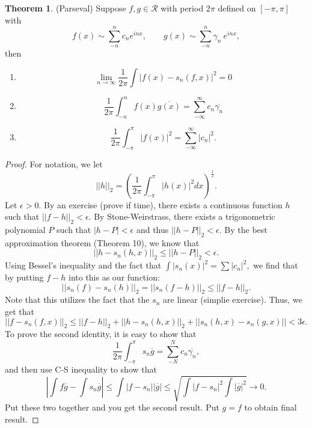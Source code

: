 \documentclass[10pt, oneside]{article}
\theoremstyle{definition}
\newtheorem{thm}{Theorem}
\begin{document}
\begin{thm}
    (Parseval) Suppose $f,g \in \mathcal{R}$ with period $2\pi$ defined on $[-\pi, \pi]$ with 
    \[f(x)\sim \sum_{-n}^n c_n e^{inx}, \qquad g(x) \sim \sum_{-n}^n \gamma_n\ e^{inx},\]
    then 
    \begin{enumerate}
        \item \[\lim_{n\to \infty}\frac{1}{2\pi}\int |f(x) - s_n(f,x)|^2 = 0\]
        \item \[\frac{1}{2\pi}\int_{-n}^n f(x)\overline{g(x)} = \sum_{-\infty}^\infty c_n \overline{\gamma_n}\]
        \item 
        \[\frac{1}{2\pi}\int_{-\pi}^\pi |f(x)|^2 = \sum_{-\infty}^\infty |c_n|^2.\]
    \end{enumerate}
\end{thm}
\begin{proof}
    For notation, we let 
    \[||h||_2 = \left(\frac{1}{2\pi}\int_{-\pi}^\pi |h(x)|^2 dx\right)^{\frac{1}{2}}.\] Let $\epsilon>0.$ By an exercise (prove if time), there exists a continuous function $h$ such that $||f-h||_2 < \epsilon.$ By Stone-Weirstrass, there exists a trigonometric polynomial $P$ such that $|h-P|< \epsilon$ and thus $||h-P||_2 < \epsilon.$ By the best approximation theorem (Theorem 10), we know that 
    \[||h-s_n(h,x)||_2 \leq ||h-P||_2 < \epsilon.\] Using Bessel's inequality and the fact that $\int |s_n(x)|^2 = \sum|c_n|^2,$ we find that by putting $f-h$ into this as our function:
    \[||s_n(f) - s_n(h)||_2 = ||s_n(f-h)||_2 \leq ||f-h||_2.\] Note that this utilizes the fact that the $s_n$ are linear (simplie exercise). Thus, we get that 
    \[||f-s_n(f,x)||_2 \leq ||f-h||_2 + ||h-s_n(h,x)||_2 + ||s_n(h,x) - s_n(g,x)||< 3\epsilon.\] To prove the second identity, it is easy to show that
    \[\frac{1}{2\pi}\int_{-\pi}^\pi s_n \overline{g} = \sum_{-N}^N c_n \overline{\gamma_n},\] and then use C-S inequality to show that
    \[|\int f \overline{g} - \int s_n \overline{g}| \leq \int |f-s_n||\overline{g}|\leq \sqrt{\int|f-s_n|^2 \int |\overline{g}|^2}\to 0.\] Put these two together and you get the second result. Put $g =f$ to obtain final result. 
\end{proof}

\newpage
\end{document}
